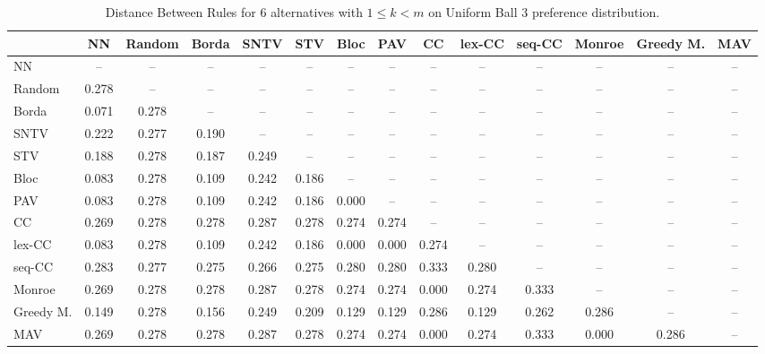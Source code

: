 
\begin{table*}
\centering
\begin{tabular}{lccccccccccccc}
\toprule
 & NN & Random & Borda & SNTV & STV & Bloc & PAV & CC & lex-CC & seq-CC & Monroe & Greedy M. & MAV \\
\midrule
NN & -- & -- & -- & -- & -- & -- & -- & -- & -- & -- & -- & -- & -- \\
Random & 0.278 & -- & -- & -- & -- & -- & -- & -- & -- & -- & -- & -- & -- \\
Borda & 0.071 & 0.278 & -- & -- & -- & -- & -- & -- & -- & -- & -- & -- & -- \\
SNTV & 0.222 & 0.277 & 0.190 & -- & -- & -- & -- & -- & -- & -- & -- & -- & -- \\
STV & 0.188 & 0.278 & 0.187 & 0.249 & -- & -- & -- & -- & -- & -- & -- & -- & -- \\
Bloc & 0.083 & 0.278 & 0.109 & 0.242 & 0.186 & -- & -- & -- & -- & -- & -- & -- & -- \\
PAV & 0.083 & 0.278 & 0.109 & 0.242 & 0.186 & 0.000 & -- & -- & -- & -- & -- & -- & -- \\
CC & 0.269 & 0.278 & 0.278 & 0.287 & 0.278 & 0.274 & 0.274 & -- & -- & -- & -- & -- & -- \\
lex-CC & 0.083 & 0.278 & 0.109 & 0.242 & 0.186 & 0.000 & 0.000 & 0.274 & -- & -- & -- & -- & -- \\
seq-CC & 0.283 & 0.277 & 0.275 & 0.266 & 0.275 & 0.280 & 0.280 & 0.333 & 0.280 & -- & -- & -- & -- \\
Monroe & 0.269 & 0.278 & 0.278 & 0.287 & 0.278 & 0.274 & 0.274 & 0.000 & 0.274 & 0.333 & -- & -- & -- \\
Greedy M. & 0.149 & 0.278 & 0.156 & 0.249 & 0.209 & 0.129 & 0.129 & 0.286 & 0.129 & 0.262 & 0.286 & -- & -- \\
MAV & 0.269 & 0.278 & 0.278 & 0.287 & 0.278 & 0.274 & 0.274 & 0.000 & 0.274 & 0.333 & 0.000 & 0.286 & -- \\
\bottomrule
\end{tabular}

\caption{Distance Between Rules for 6 alternatives with $1 \leq k < m$ on Uniform Ball 3 preference distribution.}
\end{table*}
